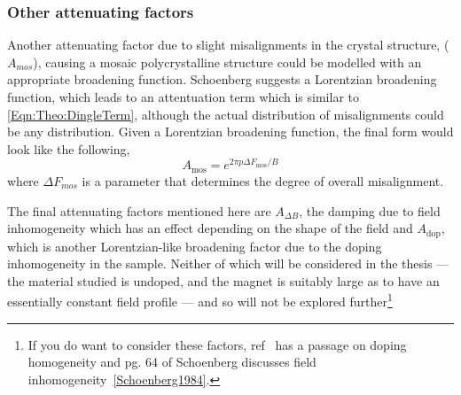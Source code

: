 \subsubsection{Other attenuating factors}

Another attenuating factor due to slight misalignments in the crystal structure, ($A_{mos}$), causing a mosaic polycrystalline structure could be modelled with an appropriate broadening function. Schoenberg suggests a Lorentzian broadening function, which leads to an attentuation term which is similar to \ref{Eqn:Theo:DingleTerm}, although the actual distribution of misalignments could be any distribution. Given a Lorentzian broadening function, the final form would look like the following,
\begin{equation}
  A_{\textrm{mos}} = e^{2\pi p \Delta F_{\textrm{mos}}/B}
\end{equation}
where $\Delta F_{mos}$ is a parameter that determines the degree of overall misalignment.

The final attenuating factors mentioned here are $A_{\Delta B}$, the damping due to field inhomogeneity which has an effect depending on the shape of the field and $A_{\textrm{dop}}$, which is another Lorentzian-like broadening factor due to the doping inhomogeneity in the sample. Neither of which will be considered in the thesis --- the material studied is undoped, and the magnet is suitably large as to have an essentially constant field profile --- and so will not be explored further\footnote{If you do want to consider these factors, ref~\cite{Rourke2010b} has a passage on doping homogeneity and pg. 64 of Schoenberg discusses field inhomogeneity~\ref{Schoenberg1984}.}




